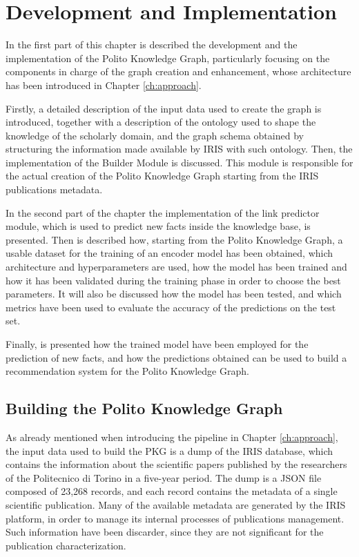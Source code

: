 \documentclass[%
    corpo=13.5pt,
    twoside,
    oldstyle,
    tipotesi=magistrale,
    greek,
    evenboxes
]{toptesi}
\begin{document}
\chapter{Development and Implementation}

In the first part of this chapter is described the development and the
implementation of the Polito Knowledge Graph, particularly focusing
on the components in charge of the graph creation and enhancement, whose
architecture has been introduced in Chapter \ref{ch:approach}.

Firstly, a detailed description of the input data used to
create the graph is introduced, together with a description of the ontology
used to shape the knowledge of the scholarly domain, and the graph
schema obtained by structuring the information made available by
IRIS with such ontology.
Then, the implementation of the Builder Module is discussed. This module
is responsible for the actual creation of the Polito Knowledge Graph
starting from the IRIS publications metadata.

In the second part of the chapter the implementation of the
link predictor module, which is used to predict new facts inside the knowledge
base, is presented.
Then is described how, starting from the Polito Knowledge Graph, a usable
dataset for the training of an encoder model has been obtained, which
architecture and hyperparameters are used, how the model has been trained and
how it has been validated during the training phase in order to choose the
best parameters.
It will also be discussed how the model has been tested, and which metrics have
been used to evaluate the accuracy of the predictions on the test set.

Finally, is presented how the trained model have been employed for the
prediction of new facts, and how the predictions obtained
can be used to build a recommendation system for the Polito Knowledge Graph.


\section{Building the Polito Knowledge Graph}
\label{sec:buildingpkg}

As already mentioned when introducing the pipeline in Chapter \ref{ch:approach},
the input data used to
build the PKG is a dump of the IRIS database, which contains the information about
the scientific papers published by the researchers of the Politecnico di
Torino in a five-year period.
The dump is a JSON file composed of 23,268 records, and each record contains
the metadata of a single scientific publication.
Many of the available metadata are generated by the IRIS platform, in
order to manage its internal processes of publications management.
Such information have been discarder, since they are not
significant for the publication characterization.
\end{document}
